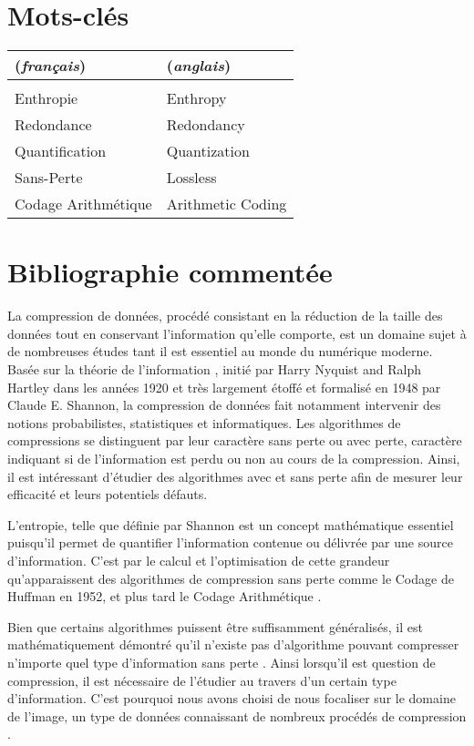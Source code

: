 \documentclass[a4paper, 11pt]{article}
\begin{document}
\section*{Mots-cl\'es}

\begin{tabular}{l l} 
    (\textit{français}) & (\textit{anglais}) \\ \hline
     & \\
    Enthropie & Enthropy \\
    Redondance & Redondancy \\
    Quantification & Quantization \\
    Sans-Perte & Lossless \\
    Codage Arithmétique & Arithmetic Coding \\
    \end{tabular}

\section*{Bibliographie comment\'ee}

La compression de données, procédé consistant en la réduction de la taille des données tout en conservant l'information qu'elle comporte, est un domaine sujet à de nombreuses études tant il est essentiel au monde du numérique moderne. Basée sur la théorie de l'information \cite{entropy}, initié par Harry Nyquist and Ralph Hartley dans les ann\'ees 1920 et très largement étoffé et formalisé en 1948 par Claude E. Shannon, la compression de données fait notamment intervenir des notions probabilistes, statistiques et informatiques. Les algorithmes de compressions se distinguent par leur caractère sans perte ou avec perte, caractère indiquant si de l'information est perdu ou non au cours de la compression. Ainsi, il est intéressant d'étudier des algorithmes avec et sans perte afin de mesurer leur efficacité et leurs potentiels défauts.

L'entropie, telle que définie par Shannon \cite{entropy} est un concept mathématique essentiel puisqu'il permet de quantifier l'information contenue ou délivrée par une source d'information. C'est par le calcul et l'optimisation de cette grandeur qu'apparaissent des algorithmes de compression sans perte comme le Codage de Huffman \cite{huffman} en 1952, et plus tard le Codage Arithmétique \cite{arithmetic-coding}.

Bien que certains algorithmes puissent être suffisamment généralisés, il est mathématiquement démontré qu'il n'existe pas d'algorithme pouvant compresser n'importe quel type d'information sans perte \cite{compression}. Ainsi lorsqu'il est question de compression, il est nécessaire de l'étudier au travers d'un certain type d'information. C'est pourquoi nous avons choisi de nous focaliser sur le domaine de l'image, un type de données connaissant de nombreux procédés de compression \cite{compression} \cite{code-theory}.
\end{document}
